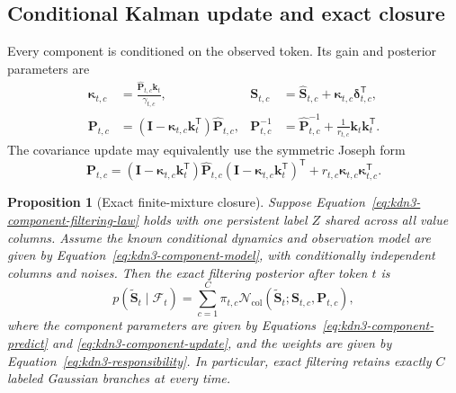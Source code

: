 \documentclass[11pt]{article}
\newcommand{\ve}[1]{\boldsymbol{#1}}
\newcommand{\tr}{\mathsf{T}}
\newcommand{\Normal}{\mathcal{N}}
\newtheorem{proposition}{Proposition}
\begin{document}
\subsection{Conditional Kalman update and exact closure}

Every component is conditioned on the observed token.  Its gain and posterior parameters are
\begin{equation}
\begin{aligned}
  \ve{\kappa}_{t,c}
  &=\frac{\widehat{\ve{P}}_{t,c}\ve{k}_t}{\gamma_{t,c}},
  &
  \ve{S}_{t,c}
  &=\widehat{\ve{S}}_{t,c}
    +\ve{\kappa}_{t,c}\ve{\delta}_{t,c}^{\tr},
  \\
  \ve{P}_{t,c}
  &=(\ve{I}-\ve{\kappa}_{t,c}\ve{k}_t^{\tr})
    \widehat{\ve{P}}_{t,c},
  &
  \ve{P}_{t,c}^{-1}
  &=\widehat{\ve{P}}_{t,c}^{-1}
    +\frac{1}{r_{t,c}}\ve{k}_t\ve{k}_t^{\tr}.
\end{aligned}
  \label{eq:kdn3-component-update}
\end{equation}
The covariance update may equivalently use the symmetric Joseph form
\begin{equation}
  \ve{P}_{t,c}
  =(\ve{I}-\ve{\kappa}_{t,c}\ve{k}_t^{\tr})
    \widehat{\ve{P}}_{t,c}
    (\ve{I}-\ve{\kappa}_{t,c}\ve{k}_t^{\tr})^{\tr}
   +r_{t,c}\ve{\kappa}_{t,c}\ve{\kappa}_{t,c}^{\tr}.
  \label{eq:kdn3-component-joseph}
\end{equation}

\begin{proposition}[Exact finite-mixture closure]
\label{prop:kdn3-mixture-closure}
Suppose Equation~\eqref{eq:kdn3-component-filtering-law} holds with one persistent label $Z$
shared across all value columns.  Assume the known conditional dynamics and observation model are
given by Equation~\eqref{eq:kdn3-component-model}, with conditionally independent columns and
noises.  Then the exact filtering
posterior after token $t$ is
\begin{equation}
  p(\widetilde{\ve{S}}_t\mid\mathcal{F}_t)
  =\sum_{c=1}^{C}\pi_{t,c}
   \Normal_{\mathrm{col}}(
     \widetilde{\ve{S}}_t;\ve{S}_{t,c},\ve{P}_{t,c}),
  \label{eq:kdn3-exact-mixture-posterior}
\end{equation}
where the component parameters are given by
Equations~\eqref{eq:kdn3-component-predict} and \eqref{eq:kdn3-component-update}, and the weights
are given by Equation~\eqref{eq:kdn3-responsibility}.  In particular, exact filtering retains
exactly $C$ labeled Gaussian branches at every time.
\end{proposition}
\end{document}
